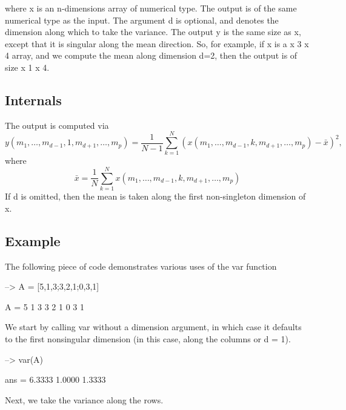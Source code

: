  where {\ttfamily x} is an {\ttfamily n}-\/dimensions array of numerical type. The output is of the same numerical type as the input. The argument {\ttfamily d} is optional, and denotes the dimension along which to take the variance. The output {\ttfamily y} is the same size as {\ttfamily x}, except that it is singular along the mean direction. So, for example, if {\ttfamily x} is a { x 3 x 4} array, and we compute the mean along dimension {\ttfamily d=2}, then the output is of size { x 1 x 4}. \hypertarget{transforms_svd_Function}{}\subsection{Internals}\label{transforms_svd_Function}
The output is computed via \[ y(m_1,\ldots,m_{d-1},1,m_{d+1},\ldots,m_{p}) = \frac{1}{N-1} \sum_{k=1}^{N} \left(x(m_1,\ldots,m_{d-1},k,m_{d+1},\ldots,m_{p}) - \bar{x}\right)^2, \] where \[ \bar{x} = \frac{1}{N} \sum_{k=1}^{N} x(m_1,\ldots,m_{d-1},k,m_{d+1},\ldots,m_{p}) \] If {\ttfamily d} is omitted, then the mean is taken along the first non-\/singleton dimension of {\ttfamily x}. \hypertarget{variables_struct_Example}{}\subsection{Example}\label{variables_struct_Example}
The following piece of code demonstrates various uses of the var function


\begin{DoxyVerbInclude}
--> A = [5,1,3;3,2,1;0,3,1]

A = 
 5 1 3 
 3 2 1 
 0 3 1 
\end{DoxyVerbInclude}


We start by calling {\ttfamily var} without a dimension argument, in which case it defaults to the first nonsingular dimension (in this case, along the columns or {\ttfamily d = 1}).


\begin{DoxyVerbInclude}
--> var(A)

ans = 
    6.3333    1.0000    1.3333 
\end{DoxyVerbInclude}


Next, we take the variance along the rows.


